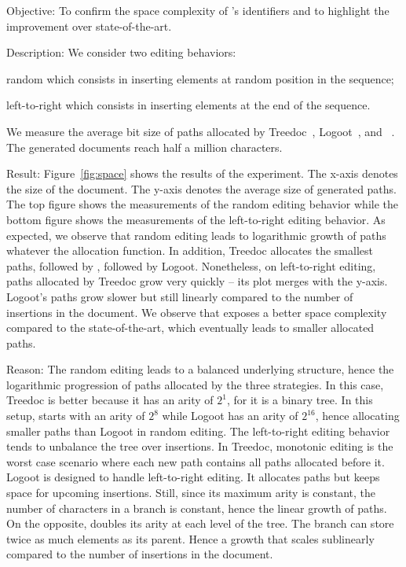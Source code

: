 \begin{asparadesc}
\item [Objective:] To confirm the space complexity of \LSEQ's identifiers and to
  highlight the improvement over state-of-the-art.
\item [Description:] We consider two editing behaviors:
  \begin{inparaenum}[(i)]
  \item random which consists in inserting elements at random position in the sequence;
  \item left-to-right which consists in inserting elements at the end of the
    sequence.
  \end{inparaenum} We measure the average bit size of paths allocated by
  Treedoc~\cite{preguica2009commutative}, Logoot~\cite{weiss2009logoot}, and
  \LSEQ~\cite{nedelec2013lseq}. The generated documents reach half a million
  characters.
\item [Result:] Figure~\ref{fig:space} shows the results of the experiment. The
  x-axis denotes the size of the document. The y-axis denotes the average size
  of generated paths. The top figure shows the measurements of the random
  editing behavior while the bottom figure shows the measurements of the
  left-to-right editing behavior. As expected, we observe that random editing
  leads to logarithmic growth of paths whatever the allocation function. In
  addition, Treedoc allocates the smallest paths, followed by \LSEQ, followed by
  Logoot. Nonetheless, on left-to-right editing, paths allocated by Treedoc grow
  very quickly -- its plot merges with the y-axis. Logoot's paths grow slower
  but still linearly compared to the number of insertions in the document. We
  observe that \LSEQ exposes a better space complexity compared to the
  state-of-the-art, which eventually leads to smaller allocated paths.
\item [Reason:] The random editing leads to a balanced underlying structure,
  hence the logarithmic progression of paths allocated by the three
  strategies. In this case, Treedoc is better because it has an arity of $2^1$,
  for it is a binary tree. In this setup, \LSEQ starts with an arity of $2^8$
  while Logoot has an arity of $2^16$, hence \LSEQ allocating smaller paths than
  Logoot in random editing. The left-to-right editing behavior tends to
  unbalance the tree over insertions. In Treedoc, monotonic editing is the worst
  case scenario where each new path contains all paths allocated before
  it. Logoot is designed to handle left-to-right editing. It allocates paths but
  keeps space for upcoming insertions. Still, since its maximum arity is
  constant, the number of characters in a branch is constant, hence the linear
  growth of paths. On the opposite, \LSEQ doubles its arity at each level of the
  tree. The branch can store twice as much elements as its parent. Hence a
  growth that scales sublinearly compared to the number of insertions in the
  document.
\end{asparadesc}

